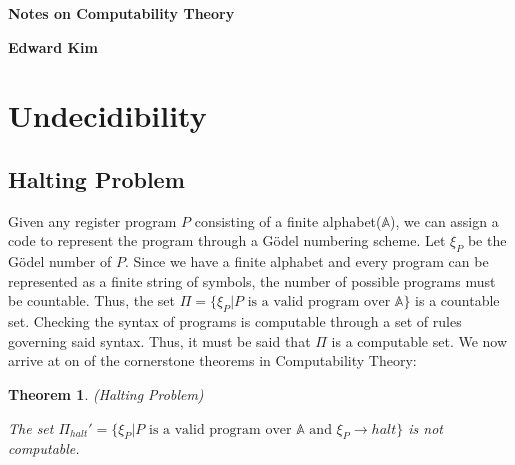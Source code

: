 \documentclass[a4paper,10pt]{article}
\newtheorem{theorem}{Theorem}[section]
\newcommand*\map{\rightarrow}
\newcommand*\n{\newline\par}
\begin{document}
\begin{titlepage}
   \centering
    {\huge\bfseries Notes on Computability Theory\par}
    \space
    {\huge\bfseries Edward Kim\par}
\end{titlepage}

\newpage
\tableofcontents

\newpage
\section{Undecidibility}

\subsection{Halting Problem}
Given any register program $P$ consisting of a finite alphabet($\mathbb{A}$), we can assign a code to represent the program through a G\"{o}del numbering scheme. Let $\xi_P$ be the G\"{o}del number of $P$.
Since we have a finite alphabet and every program can be represented as a finite string of symbols, the number of possible programs must be countable. Thus, the set 
$\Pi = \{\xi_P \vert \text{$P$ is a valid program over $\mathbb{A}$}\}$ is a countable set. Checking the syntax of programs is computable through a set of rules governing said syntax. Thus, it must be said that
$\Pi$ is a computable set. We now arrive at on of the cornerstone theorems in Computability Theory:

\begin{theorem}
 (Halting Problem) \n
 The set $\Pi_{halt}' = \{\xi_P \vert \text{$P$ is a valid program over $\mathbb{A}$ and $\xi_P \map halt$}\}$ is not computable.
\end{theorem}
\end{document}
